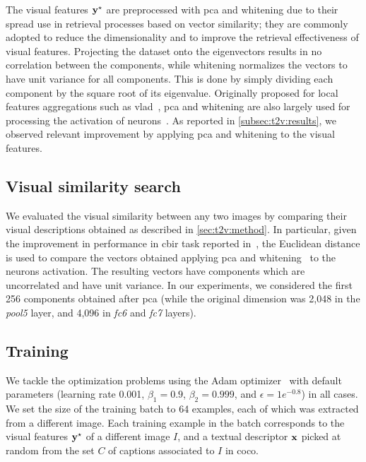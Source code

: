 The visual features $\mathbf{y}^\star$ are preprocessed with \gls{pca} and whitening due to their spread use in retrieval processes based on vector similarity;
they are commonly adopted to reduce the dimensionality and to improve the retrieval effectiveness of visual features.
Projecting the dataset onto the eigenvectors results in no correlation between the components, while whitening normalizes the vectors to have unit variance for all components.
This is done by simply dividing each component by the square root of its eigenvalue.
Originally proposed for local features aggregations such as \gls{vlad}~\cite{jegou2012negative}, \gls{pca} and whitening are also largely used for processing the activation of neurons~\cite{sharif2014cnn,gong2014multi,gordo2016deep}.
As reported in \ref{subsec:t2v:results}, we observed relevant improvement by applying \gls{pca} and whitening to the visual features.



\subsection{Visual similarity search}

We evaluated the visual similarity between any two images by comparing their visual descriptions obtained as described in \ref{sec:t2v:method}.
In particular, given the improvement in performance in \gls{cbir} task reported in~\cite{sharif2014cnn,gong2014multi,gordo2016deep}, the Euclidean distance is used to compare the vectors obtained applying \gls{pca} and whitening~\cite{comon1994independent} to the neurons activation.
The resulting vectors have components which are uncorrelated and have unit variance.
In our experiments, we considered the first 256 components obtained after \gls{pca} (while the original dimension was 2,048 in the \emph{pool5} layer, and 4,096 in \emph{fc6} and \emph{fc7} layers).


\subsection{Training}

We tackle the optimization problems using the Adam optimizer~\cite{kingma2014adam} with default parameters (learning rate 0.001, $\beta_1=\text{0.9}$, $\beta_2=\text{0.999}$, and $\epsilon=1e^{-0.8}$) in all cases.
We set the size of the training batch to 64 examples, each of which was extracted from a different image.
Each training example in the batch corresponds to the visual features $\mathbf{y}^\star$ of a different image $I$, and a textual descriptor $\mathbf{x}$ picked at random from the set $C$ of captions associated to $I$ in \gls{coco}.

